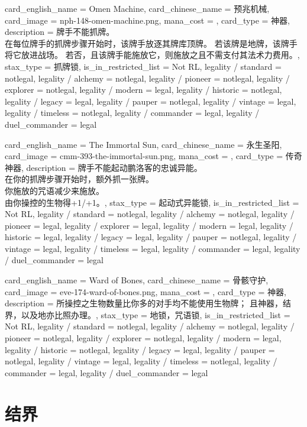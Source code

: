 \documentclass[lang = cn, color = black, 10pt]{AllThatStax}
\begin{document}
\card
{
	card_english_name = {Omen Machine},
	card_chinese_name = {预兆机械},
	card_image = nph-148-omen-machine.png,
	mana_cost = ,
	card_type = 神器,
	description = {牌手不能抓牌。\\
		在每位牌手的抓牌步骤开始时，该牌手放逐其牌库顶牌。 若该牌是地牌，该牌手将它放进战场。 若否，且该牌手能施放它，则施放之且不需支付其法术力费用。},
	stax_type = 抓牌锁,
	is_in_restricted_list = Not RL,
	legality / standard = notlegal,
	legality / alchemy = notlegal,
	legality / pioneer = notlegal,
	legality / explorer = notlegal,
	legality / modern = legal,
	legality / historic = notlegal,
	legality / legacy = legal,
	legality / pauper = notlegal,
	legality / vintage = legal,
	legality / timeless = notlegal,
	legality / commander = legal,
	legality / duel_commander = legal
}

\card
{
	card_english_name = {The Immortal Sun},
	card_chinese_name = {永生圣阳},
	card_image = cmm-393-the-immortal-sun.png,
	mana_cost = ,
	card_type = 传奇神器,
	description = {牌手不能起动鹏洛客的忠诚异能。\\
		在你的抓牌步骤开始时，额外抓一张牌。\\
		你施放的咒语减少来施放。\\
		由你操控的生物得+1/+1。},
	stax_type = 起动式异能锁,
	is_in_restricted_list = Not RL,
	legality / standard = notlegal,
	legality / alchemy = notlegal,
	legality / pioneer = legal,
	legality / explorer = legal,
	legality / modern = legal,
	legality / historic = legal,
	legality / legacy = legal,
	legality / pauper = notlegal,
	legality / vintage = legal,
	legality / timeless = legal,
	legality / commander = legal,
	legality / duel_commander = legal
}

\card
{
	card_english_name = {Ward of Bones},
	card_chinese_name = {骨骸守护},
	card_image = eve-174-ward-of-bones.png,
	mana_cost = ,
	card_type = 神器,
	description = {所操控之生物数量比你多的对手均不能使用生物牌； 且神器，结界，以及地亦比照办理。},
	stax_type = 地锁，咒语锁,
	is_in_restricted_list = Not RL,
	legality / standard = notlegal,
	legality / alchemy = notlegal,
	legality / pioneer = notlegal,
	legality / explorer = notlegal,
	legality / modern = legal,
	legality / historic = notlegal,
	legality / legacy = legal,
	legality / pauper = notlegal,
	legality / vintage = legal,
	legality / timeless = notlegal,
	legality / commander = legal,
	legality / duel_commander = legal
}

\section{结界}
\end{document}

